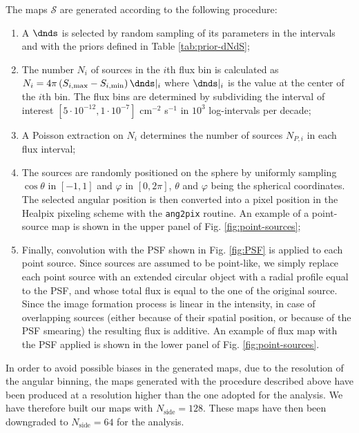 The maps $\mathcal{S}$ are generated according to the following procedure:
\begin{enumerate}
\item A $\dnds$ is selected by random sampling of its parameters in the intervals and with the priors defined in Table \ref{tab:prior-dNdS};

\item The number $N_i$ of sources in the $i$th flux bin is calculated as $N_i = 4\pi \, (S_{i, \textrm{max}} - S_{i, \textrm{min}}) \, \dnds|_i$ where $\dnds|_i$ is the value at the center of the $i$th bin. The flux bins are determined by subdividing the interval of interest {$[5 \cdot 10^{-12}, 1 \cdot 10^{-7}]$ } cm$^{-2}$ s$^{-1}$ in $10^3$ log-intervals per decade;

\item A Poisson extraction on $N_i$ determines the number of sources $N_{P,i}$ in each flux interval;

\item The sources are randomly positioned on the sphere by uniformly sampling $\cos\theta$ in $[-1,1]$ and $\varphi$ in $[0, 2\pi]$, $\theta$ and $\varphi$ being the spherical coordinates. The selected angular position is then converted into a pixel position in the Healpix pixeling scheme with the \texttt{ang2pix} routine. An example of a point-source map is shown in the upper panel of Fig. \ref{fig:point-sources};

\item Finally, convolution with the \fermi PSF shown in Fig. \ref{fig:PSF} is applied to each point source. Since sources are assumed to be point-like, we simply replace each point source with an extended circular object with a radial profile equal to the PSF, and whose total flux is equal to the one of the original source. Since the image formation process is linear in the intensity, in case of overlapping sources (either because of their spatial position, or because of the PSF smearing) the resulting flux is additive. An example of flux map with the PSF applied is shown in the lower panel of Fig. \ref{fig:point-sources}.
\end{enumerate}

In order to avoid possible biases in the generated maps, due to the resolution of the angular binning, the maps generated with the procedure described above have been produced at a resolution higher than the one adopted for the analysis. We have therefore built our maps with $N_\textrm{side} = 128$. These maps have then been downgraded to $N_\textrm{side} = 64$ for the analysis.

